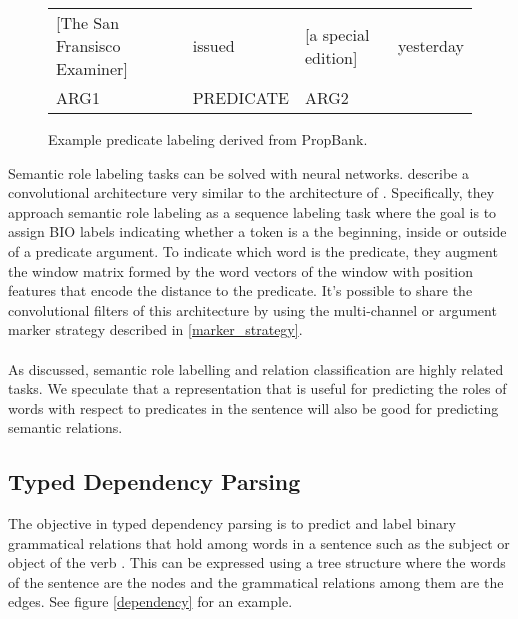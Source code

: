 \begin{figure}[h]
	\centering
	\begin{tabular}{l l l l}
		[The San Fransisco Examiner] & issued & [a special edition] & yesterday \\
		ARG1 & PREDICATE & ARG2 &
	\end{tabular}
	\caption{Example predicate labeling derived from PropBank.}
	\label{framenet}
\end{figure}
\noindent
Semantic role labeling tasks can be solved with neural networks. \citet{collobert2011} describe a convolutional architecture very similar to the architecture of \citet{nguyen2015}. Specifically, they approach semantic role labeling as a sequence labeling task where the goal is to assign BIO labels indicating whether a token is a the beginning, inside or outside of a predicate argument. To indicate which word is the predicate, they augment the window matrix formed by the word vectors of the window with position features that encode the distance to the predicate. It's possible to share the convolutional filters of this architecture by using the multi-channel or argument marker strategy described in \ref{marker_strategy}.
\\\\
As discussed, semantic role labelling and relation classification are highly related tasks. We speculate that a representation that is useful for predicting the roles of words with respect to predicates in the sentence will also be good for predicting semantic relations.

\subsection{Typed Dependency Parsing}
The objective in typed dependency parsing is to predict and label binary grammatical relations that hold among words in a sentence such as the subject or object of the verb \citep{jurafsky09}. This can be expressed using a tree structure where the words of the sentence are the nodes and the grammatical relations among them are the edges. See figure \ref{dependency} for an example.

